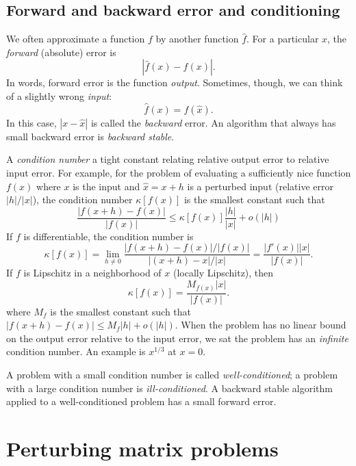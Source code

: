 \documentclass[12pt, leqno]{article}
\begin{document}
\subsection{Forward and backward error and conditioning}

We often approximate a function $f$ by another function $\hat{f}$.
For a particular $x$, the {\em forward} (absolute) error is
\[
  |\hat{f}(x)-f(x)|.
\]
In words, forward error is the function {\em output}.  Sometimes,
though, we can think of a slightly wrong {\em input}:
\[
  \hat{f}(x) = f(\hat{x}).
\]
In this case, $|x-\hat{x}|$ is called the {\em backward} error.
An algorithm that always has small backward error is {\em backward stable}.

A {\em condition number} a tight constant relating relative output
error to relative input error.  For example, for the problem of
evaluating a sufficiently nice function $f(x)$ where $x$ is the input
and $\hat{x} = x+h$ is a perturbed input (relative error $|h|/|x|$),
the condition number $\kappa[f(x)]$ is the smallest constant such that
\[
  \frac{|f(x+h)-f(x)|}{|f(x)|} \leq \kappa[f(x)] \frac{|h|}{|x|} + o(|h|)
\]
If $f$ is differentiable, the condition number is
\[
\kappa[f(x)] =
  \lim_{h \neq 0} \frac{|f(x+h)-f(x)|/|f(x)|}{|(x+h)-x|/|x|} =
  \frac{|f'(x)||x|}{|f(x)|}.
\]
If $f$ is Lipschitz in a neighborhood of $x$ (locally Lipschitz), then
\[
\kappa[f(x)] =
  \frac{M_{f(x)}|x|}{|f(x)|}.
\]
where $M_f$ is the smallest constant such that
$|f(x+h)-f(x)| \leq M_f |h| + o(|h|)$.  When the problem has no linear
bound on the output error relative to the input error, we sat the
problem has an {\em infinite} condition number.  An example is
$x^{1/3}$ at $x = 0$.

A problem with a small condition number is called {\em well-conditioned};
a problem with a large condition number is {\em ill-conditioned}.
A backward stable algorithm applied to a well-conditioned problem has
a small forward error.

\section{Perturbing matrix problems}
\end{document}
